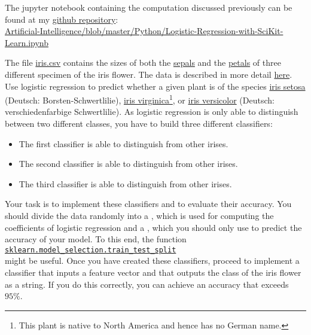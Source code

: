The jupyter notebook containing the computation discussed previously can be found at my \href{https://github.com/karlstroetmann/Artificial-Intelligence}{github repository}:
\\[0.2cm]
\hspace*{1.3cm}
\href{https://github.com/karlstroetmann/Artificial-Intelligence/blob/master/Python/Logistic-Regression-with-SciKit-Learn.ipynb}
{Artificial-Intelligence/blob/master/Python/Logistic-Regression-with-SciKit-Learn.ipynb}

\exercise 
The file \href{https://github.com/karlstroetmann/Artificial-Intelligence/blob/master/Python/iris.csv}{iris.csv}
contains the sizes of both the \href{https://en.wikipedia.org/wiki/Sepal}{sepals} and the
\href{https://en.wikipedia.org/wiki/Pepal}{petals} of three different specimen of the iris flower.  The
data is described in more detail \href{https://en.wikipedia.org/wiki/Iris_flower_data_set}{here}. 
Use logistic regression to predict whether a given plant is of the species
\href{https://en.wikipedia.org/wiki/Iris_setosa}{iris setosa} (Deutsch: Borsten-Schwertlilie),
\href{https://en.wikipedia.org/wiki/Iris_virginica}{iris virginica}\footnote{
This plant is native to North America and hence has no German name.}, or
\href{https://en.wikipedia.org/wiki/Iris_versicolor}{iris versicolor} (Deutsch: verschiedenfarbige Schwertlilie).
As logistic regression is only able to distinguish between two different classes, you
have to build three different classifiers:
\begin{itemize}
\item The first classifier is able to distinguish  from other irises. 
\item The second classifier is able to distinguish  from other irises. 
\item The third classifier is able to distinguish  from other irises. 
\end{itemize}
Your task is to implement these classifiers and to evaluate their accuracy.  
You should  divide the data randomly into a , which is used for computing the
coefficients of logistic regression and a , which you should only use to predict the
accuracy of your model.  To this end, the function
\\[0.2cm]
\hspace*{1.3cm}
\href{https://scikit-learn.org/stable/modules/generated/sklearn.model_selection.train_test_split.html}{\texttt{sklearn.model\_selection.train\_test\_split}}
\\[0.2cm]
might be useful.  Once you have created these classifiers, proceed to implement a classifier that inputs a
feature vector and that outputs the class of the iris flower as a string.  If you do this correctly, you can
achieve an accuracy that exceeds $95\%$.
\eox

